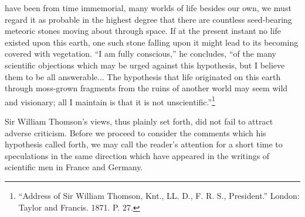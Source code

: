\documentclass[a4paper, 11pt, oneside, english]{article}
\begin{document}
have been from time immemorial, many worlds of life besides our own, we must regard it as probable in the highest degree that there are countless seed-bearing meteoric stones moving about through space. If at the present instant no life existed upon this earth, one such stone falling upon it might lead to its becoming covered with vegetation. ``I am fully conscious,'' he concludes, ``of the many scientific objections which may be urged against this hypothesis, but I believe them to be all answerable... The hypothesis that life originated on this earth through moss-grown fragments from the ruins of another world may seem wild and visionary; all I maintain is that it is not unscientific.''\footnote{``Address of Sir William Thomson, Knt., LL. D., F. R. S., President.'' London: Taylor and Francis. 1871. P. 27.}

Sir William Thomson's views, thus plainly set forth, did not fail to attract adverse criticism. Before we proceed to consider the comments which his hypothesis called forth, we may call the reader's attention for a short time to speculations in the same direction which have appeared in the writings of scientific men in France and Germany.
\end{document}
